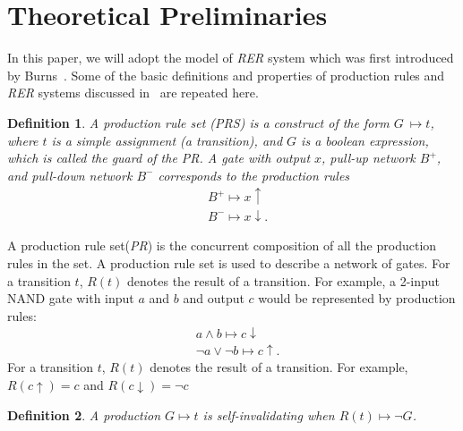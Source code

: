 \documentclass[sigconf, 10pt, twocolumn]{acmart}
\newtheorem{mydef}{Definition}
\begin{document}
\section{Theoretical Preliminaries}
In this paper, we will adopt the model of {\it RER\/} system which was first introduced by Burns~\cite{Burns:Peformance}. Some of the basic definitions and properties of production rules and {\it RER\/} systems discussed in~\cite{Manohar:Quasi,Burns:Peformance,Hulgaard:Report,Hua:Exact} are repeated here.
\begin{mydef}
A production rule set ({\it PRS\/}) is a construct of the form $G \ \stackrel{}{\mapsto} t$, where $t$ is a simple assignment (a transition), and $G$ is a boolean expression, which is called the guard of the {\it PR\/}. A gate with output $x$, pull-up network $B^{+}$, and pull-down network $B^{-}$ corresponds to the production rules
\begin{align}
&B^{+} \stackrel{}{\mapsto} x\uparrow \\ \nonumber
&B^{-} \stackrel{}{\mapsto} x\downarrow.
\end{align}
\end{mydef}
A production rule set({\it PR\/}) is the concurrent composition of all the production rules in the set. A production rule set is used to describe a network of gates. For a transition $t$, $R(t)$ denotes the result of a transition. For example, a 2-input NAND gate with input $a$ and $b$ and output $c$ would be represented by production rules:
\begin{align}
&a \wedge b \stackrel{}{\mapsto} c\downarrow \\ \nonumber
&\neg a \vee \neg b \stackrel{}{\mapsto} c\uparrow.
\end{align}
  For a transition $t$, $R(t)$ denotes the result of a transition. For example, $R(c\uparrow) = c$ and $R(c\downarrow) = \neg c$
\begin{mydef}
A production $G \stackrel{}{\mapsto} t$ is self-invalidating when $R(t) \stackrel{}{\mapsto} \neg G$.
\end{mydef}
\end{document}
